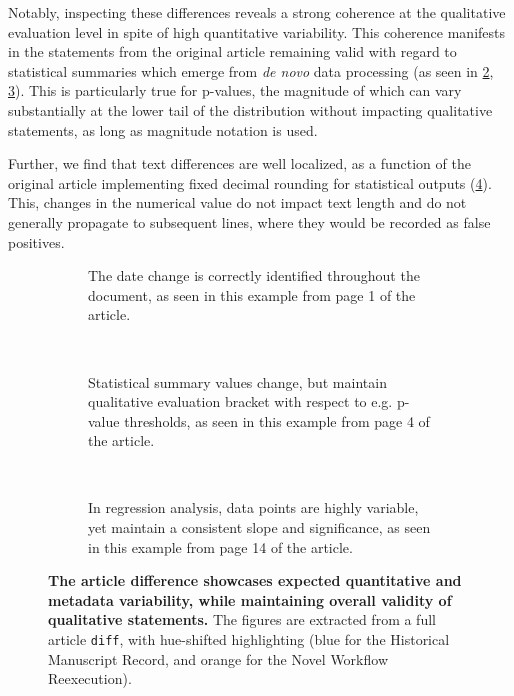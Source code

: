 Notably, inspecting these differences reveals a strong coherence at the qualitative evaluation level in spite of high quantitative variability.
This coherence manifests in the statements from the original article remaining valid with regard to statistical summaries which emerge from  \textit{de novo} data processing (as seen in \ref{fig:diff_text}, \ref{fig:diff_fig}).
This is particularly true for p-values, the magnitude of which can vary substantially at the lower tail of the distribution without impacting qualitative statements, as long as magnitude notation is used.

Further, we find that text differences are well localized, as a function of the original article implementing fixed decimal rounding for statistical outputs (\cref{fig:diff}).
This, changes in the numerical value do not impact text length and do not generally propagate to subsequent lines, where they would be recorded as false positives.

\begin{figure}[H]
	\centering
	\begin{subfigure}{0.99\textwidth}
		\centering
		\caption{
			The date change is correctly identified throughout the document, as seen in this example from page 1 of the article.
		}
		\label{fig:diff_date}
	\end{subfigure}
	\\
	\begin{subfigure}{0.99\textwidth}
		\centering
		\caption{
			Statistical summary values change, but maintain qualitative evaluation bracket with respect to e.g. p-value thresholds, as seen in this example from page 4 of the article.
		}
		\label{fig:diff_text}
	\end{subfigure}
	\\
	\vspace{1em}
	\begin{subfigure}{0.99\textwidth}
		\centering
		\caption{
			In regression analysis, data points are highly variable, yet maintain a consistent slope and significance, as seen in this example from page 14 of the article.
		}
		\label{fig:diff_fig}
	\end{subfigure}
	\caption{
		\textbf{The article difference showcases expected quantitative and metadata variability, while maintaining overall validity of qualitative statements.}
		The figures are extracted from a full article \texttt{diff}, with hue-shifted highlighting (blue for the Historical Manuscript Record, and orange for the Novel Workflow Reexecution).
	}
	\label{fig:diff}
\end{figure}

